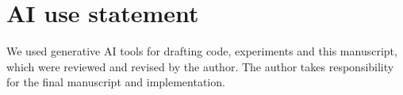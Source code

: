 \section*{AI use statement}
We used generative AI tools for drafting code, experiments and this manuscript, which were reviewed and revised by the author. The author takes responsibility for the final manuscript and implementation.
